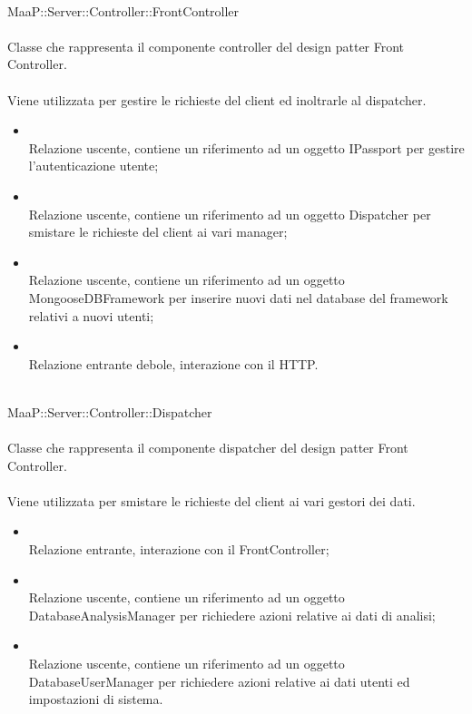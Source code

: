 \\
MaaP::Server::Controller::FrontController\\
\\
Classe che rappresenta il componente controller del design patter Front Controller.\\
\\
Viene utilizzata per gestire le richieste del client ed inoltrarle al dispatcher.
\begin{itemize}
\item{}\\
Relazione uscente, contiene un riferimento ad un oggetto IPassport per gestire l'autenticazione utente;
\item{}\\
Relazione uscente, contiene un riferimento ad un oggetto Dispatcher per smistare le richieste del client ai vari manager;
\item{}\\
Relazione uscente, contiene un riferimento ad un oggetto MongooseDBFramework per inserire nuovi dati nel database del framework relativi a nuovi utenti;
\item{}\\
Relazione entrante debole, interazione con il  HTTP.
\end{itemize}

\\
MaaP::Server::Controller::Dispatcher\\
\\
Classe che rappresenta il componente dispatcher del design patter Front Controller.\\
\\
Viene utilizzata per smistare le richieste del client ai vari gestori dei dati.
\begin{itemize}
\item{}\\
Relazione entrante, interazione con il FrontController;
\item{}\\
Relazione uscente, contiene un riferimento ad un oggetto DatabaseAnalysisManager per richiedere azioni relative ai dati di analisi;
\item{}\\
Relazione uscente, contiene un riferimento ad un oggetto DatabaseUserManager per richiedere azioni relative ai dati utenti ed impostazioni di sistema.
\end{itemize}



